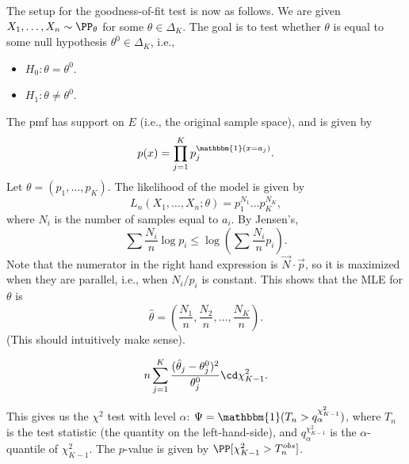 The setup for the goodness-of-fit test is now as follows. We are given $X_1, \hdots, X_n\sim \PP_{\theta}$ for some $\theta\in \Delta_K$. The goal is to test whether $\theta$ is equal to some null hypothesis $\theta^0\in \Delta_K$, i.e.,
\begin{itemize}
    \item $H_0: \theta=\theta^0$.
    \item $H_1: \theta\neq \theta^0$.
\end{itemize}
The pmf has support on $E$ (i.e., the original sample space), and is given by 
\[p(x) = \prod_{j=1}^K p_j^{\mathbbm{1}(x=a_j)}.\]
Let $\theta=(p_1, \hdots, p_K)$. The likelihood of the model is given by 
\[L_n(X_1, \hdots, X_n; \theta) = p_1^{N_1}\hdots p_K^{N_K},\]
where $N_i$ is the number of samples equal to $a_i$. By Jensen's, 
\[\sum \frac{N_i}{n}\log p_i\leq \log\left(\sum \frac{N_i}{n}p_i\right).\]
Note that the numerator in the right hand expression is $\vec{N}\cdot \vec{p}$, so it is maximized when they are parallel, i.e., when $N_i/p_i$ is constant. This shows that the MLE for $\theta$ is 
\[\hat{\theta}=\left(\frac{N_1}{n}, \frac{N_2}{n}, \hdots, \frac{N_K}{n}\right).\]
(This should intuitively make sense). 

\begin{theorem}

\[n\sum_{j=1}^K\frac{(\hat{\theta}_j-\theta^0_j)^2}{\theta^0_j}\cd \chi_{K-1}^2.\]
\end{theorem}

This gives us the $\chi^2$ test with level $\alpha$: $\Psi=\mathbbm{1}(T_n > q_{\alpha}^{\chi^2_{K-1}})$, where $T_n$ is the test statistic (the quantity on the left-hand-side), and $q_{\alpha}^{\chi^2_{K-1}}$ is the $\alpha$-quantile of $\chi^2_{K-1}$. The $p$-value is given by $\PP[\chi^2_{K-1}>T_{n}^{obs}]$. 




